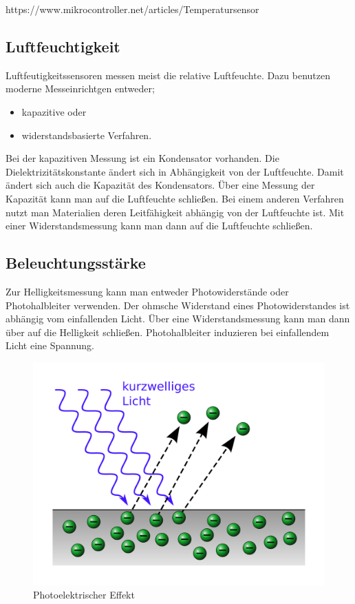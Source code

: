 https://www.mikrocontroller.net/articles/Temperatursensor
\subsection{Luftfeuchtigkeit}
\label{sec:Luftfeute}
Luftfeutigkeitssensoren messen meist die relative Luftfeuchte. Dazu benutzen moderne Messeinrichtgen entweder;
\begin{itemize}
\item kapazitive oder 
\item widerstandsbasierte Verfahren.
\end{itemize}
Bei der kapazitiven Messung ist ein Kondensator vorhanden.  Die Dielektrizitätskonstante ändert sich in Abhängigkeit von der Luftfeuchte. Damit ändert sich auch die Kapazität des Kondensators. Über eine Messung der Kapazität kann man auf die Luftfeuchte schließen.
Bei einem anderen Verfahren nutzt man Materialien deren Leitfähigkeit abhängig von der Luftfeuchte ist. Mit einer Widerstandsmessung kann man dann auf die Luftfeuchte schließen.



\subsection{Beleuchtungsstärke}
Zur Helligkeitsmessung kann man entweder Photowiderstände oder Photohalbleiter verwenden. 
Der ohmsche Widerstand eines Photowiderstandes ist abhängig vom einfallenden Licht. Über eine Widerstandsmessung kann man dann über auf die Helligkeit schließen. 
Photohalbleiter induzieren bei einfallendem Licht eine Spannung.

\begin{figure}
\includegraphics[scale=0.1]{bilder/Fotoelektrischer_Effekt} 
\caption[Photoelektrischer Effekt]{Photoelektrischer Effekt \cite{wikiPhoto} }
\label{Bewegungsmelder}
\end{figure}

